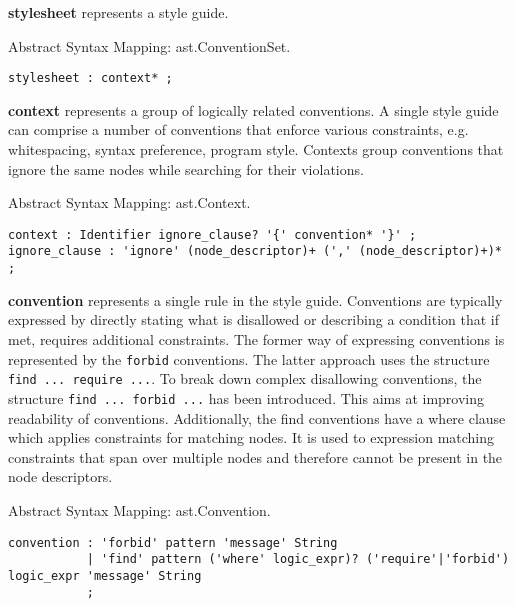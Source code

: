 \begin{description}

\item\textbf{stylesheet} represents a style guide.

Abstract Syntax Mapping: ast.ConventionSet.

\begin{snippet}
\begin{verbatim}
stylesheet : context* ;
\end{verbatim}
\end{snippet}

\item\textbf{context} represents a group of logically related conventions. A single style guide can comprise a number of conventions that enforce various constraints, e.g. whitespacing, syntax preference, program style. Contexts group conventions that ignore the same nodes while searching for their violations.  

Abstract Syntax Mapping: ast.Context.

\begin{snippet}
\begin{verbatim}
context : Identifier ignore_clause? '{' convention* '}' ;
ignore_clause : 'ignore' (node_descriptor)+ (',' (node_descriptor)+)* ;
\end{verbatim}
\end{snippet}

\item\textbf{convention} represents a single rule in the style guide. Conventions are typically expressed by directly stating what is disallowed or describing a condition that if met, requires additional constraints. The former way of expressing conventions is represented by the \texttt{forbid} conventions. The latter approach uses the structure \texttt{find ... require ...}. To break down complex disallowing conventions, the structure \texttt{find ... forbid ...} has been introduced. This aims at improving readability of conventions. Additionally, the find conventions have a where clause which applies constraints for matching nodes. It is used to expression matching constraints that span over multiple nodes and therefore cannot be present in the node descriptors.

Abstract Syntax Mapping: ast.Convention.

\begin{snippet}
\begin{verbatim}
convention : 'forbid' pattern 'message' String
           | 'find' pattern ('where' logic_expr)? ('require'|'forbid') logic_expr 'message' String
           ;
\end{verbatim}
\end{snippet}


\end{description}
